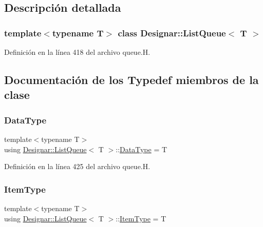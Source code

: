 \subsection{Descripción detallada}
\subsubsection*{template$<$typename T$>$\newline
class Designar\+::\+List\+Queue$<$ T $>$}



Definición en la línea 418 del archivo queue.\+H.



\subsection{Documentación de los \textquotesingle{}Typedef\textquotesingle{} miembros de la clase}
\mbox{\label{class_designar_1_1_list_queue_a5aae5b0703cf71bce7457e5420d59c8f}} 
\subsubsection{\texorpdfstring{Data\+Type}{DataType}}
{\footnotesize\ttfamily template$<$typename T$>$ \\
using \hyperlink{class_designar_1_1_list_queue}{Designar\+::\+List\+Queue}$<$ T $>$\+::\hyperlink{class_designar_1_1_s_l_list_aa98659227d90b392a1b52fa5e9b292f4}{Data\+Type} =  T}



Definición en la línea 425 del archivo queue.\+H.

\mbox{\label{class_designar_1_1_list_queue_ab2057fd5d92eccf8de8daed70e0182b2}} 
\subsubsection{\texorpdfstring{Item\+Type}{ItemType}}
{\footnotesize\ttfamily template$<$typename T$>$ \\
using \hyperlink{class_designar_1_1_list_queue}{Designar\+::\+List\+Queue}$<$ T $>$\+::\hyperlink{class_designar_1_1_s_l_list_a8ec47bfb6b0d74c8f85111b7b3c05cb2}{Item\+Type} =  T}



